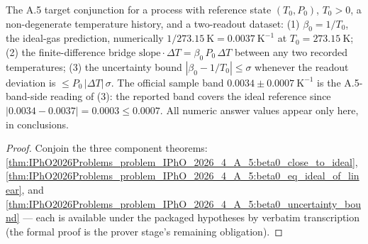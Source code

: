 \begin{theorem}
\label{thm:IPhO2026Problems_problem_IPhO_2026_4_A_5:main}
The A.5 target conjunction for a process with reference state
$(T_0, P_0)$, $T_0 > 0$, a non-degenerate temperature history, and a
two-readout dataset: (1) $\beta_0 = 1/T_0$, the ideal-gas prediction,
numerically $1/273.15\ \mathrm{K} = 0.0037\ \mathrm{K^{-1}}$ at
$T_0 = 273.15\ \mathrm{K}$; (2) the finite-difference bridge
$\mathrm{slope}\cdot\Delta T = \beta_0\,P_0\,\Delta T$ between any two
recorded temperatures; (3) the uncertainty bound
$|\beta_0 - 1/T_0| \le \sigma$ whenever the readout deviation is
$\le P_0\,|\Delta T|\,\sigma$.  The official sample band
$0.0034 \pm 0.0007\ \mathrm{K^{-1}}$ is the A.5-band-side reading of (3):
the reported band covers the ideal reference since
$|0.0034 - 0.0037| = 0.0003 \le 0.0007$.  All numeric answer values
appear only here, in conclusions.
\end{theorem}
\begin{proof}
Conjoin the three component theorems:
\cref{thm:IPhO2026Problems_problem_IPhO_2026_4_A_5:beta0_close_to_ideal},
\cref{thm:IPhO2026Problems_problem_IPhO_2026_4_A_5:beta0_eq_ideal_of_linear},
and
\cref{thm:IPhO2026Problems_problem_IPhO_2026_4_A_5:beta0_uncertainty_bound}
--- each is available under the packaged hypotheses by verbatim
transcription (the formal proof is the prover stage's remaining
obligation).
\end{proof}
